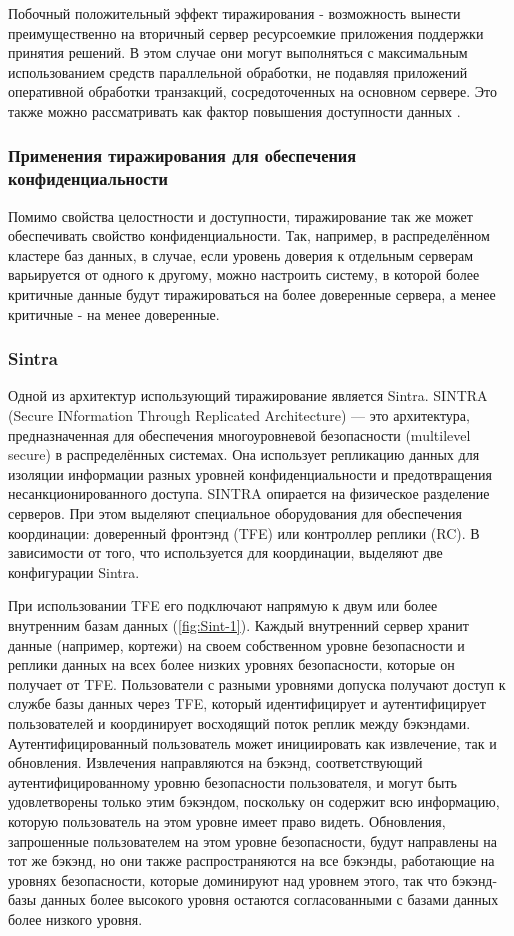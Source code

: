 Побочный положительный эффект тиражирования - возможность вынести преимущественно на вторичный
сервер ресурсоемкие приложения поддержки принятия решений. В этом случае они могут выполняться с
максимальным использованием средств параллельной обработки, не подавляя приложений оперативной
обработки транзакций, сосредоточенных на основном сервере. Это также можно рассматривать как фактор
повышения доступности данных \cite{data-replication}.

\subsubsection{Применения тиражирования для обеспечения конфиденциальности}

Помимо свойства целостности и доступности, тиражирование так же может обеспечивать свойство
конфиденциальности. Так, например, в распределённом кластере баз данных, в случае, если уровень
доверия к отдельным серверам варьируется от одного к другому, можно настроить систему, в
которой более критичные данные будут тиражироваться на более доверенные сервера, а менее
критичные - на менее доверенные.

\subsubsection{Sintra}

Одной из архитектур использующий тиражирование является Sintra. SINTRA (Secure INformation Through Replicated Architecture) — это архитектура, предназначенная для обеспечения многоуровневой безопасности (multilevel secure) в распределённых системах. Она использует репликацию данных для изоляции информации разных уровней конфиденциальности и предотвращения несанкционированного доступа. SINTRA опирается на физическое разделение серверов. При этом выделяют специальное оборудования для обеспечения координации: доверенный фронтэнд (TFE) или контроллер реплики (RC). В зависимости от того, что используется для координации, выделяют две конфигурации Sintra.

При использовании TFE его подключают напрямую к двум или более внутренним базам данных (\ref{fig:Sint-1}).
Каждый внутренний сервер хранит данные (например, кортежи) на своем собственном уровне безопасности и реплики данных на всех более низких уровнях безопасности, которые он
получает от TFE. Пользователи с разными уровнями допуска получают доступ к службе базы данных через TFE, который идентифицирует и аутентифицирует пользователей и координирует
восходящий поток реплик между бэкэндами. Аутентифицированный пользователь может инициировать как извлечение, так и обновления. Извлечения направляются на бэкэнд,
соответствующий аутентифицированному уровню безопасности пользователя, и
могут быть удовлетворены только этим бэкэндом, поскольку он содержит всю
информацию, которую пользователь на этом уровне имеет право
видеть. Обновления, запрошенные пользователем на этом уровне безопасности,
будут направлены на тот же бэкэнд, но они также
распространяются на все бэкэнды, работающие на уровнях безопасности, которые
доминируют над уровнем этого, так что бэкэнд-базы данных более высокого уровня
остаются согласованными с базами данных более низкого уровня. 

